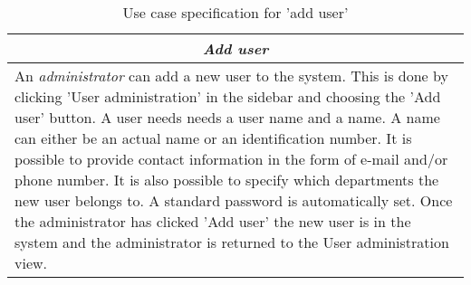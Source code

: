 \begin{table}
\centering
\begin{tabular}{p{12cm}}
\hline
\multicolumn{1}{c}{\textit{\textbf{Add user}}} \\
\hline
An \textit{administrator} can add a new user to the system.
This is done by clicking 'User administration' in the sidebar and choosing the 'Add user' button.
A user needs needs a user name and a name.
A name can either be an actual name or an identification number.
It is possible to provide contact information in the form of e-mail and/or phone number.
It is also possible to specify which departments the new user belongs to.
A standard password is automatically set.
Once the administrator has clicked 'Add user' the new user is in the system and the administrator is returned to the User administration view.
\\\hline
\end{tabular}
\caption{Use case specification for 'add user'}\label{tab:add-user}
\end{table}
